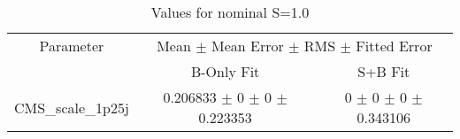 \begin{table}
\centering
\caption{Values for nominal S=1.0}
\begin{tabular}{ccc}
\toprule
Parameter 	& \multicolumn{2}{c}{Mean $\pm$ Mean Error $\pm$ RMS $\pm$ Fitted Error}\\
 	& B-Only Fit & S+B Fit\\
\midrule
CMS\_scale\_1p25j 	& \num{0.206833} $\pm$ \num{0} $\pm$ \num{0} $\pm$ \num{0.223353} 	& \num{0} $\pm$ \num{0} $\pm$ \num{0} $\pm$ \num{0.343106}\\
\bottomrule
\end{tabular}
\end{table}